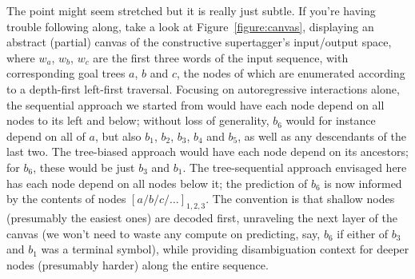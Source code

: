 The point might seem stretched but it is really just subtle.
If you're having trouble following along, take a look at Figure~\ref{figure:canvas}, displaying an abstract (partial) canvas of the constructive supertagger's input/output space, where $w_a$, $w_b$, $w_c$ are the first three words of the input sequence, with corresponding goal trees $a$, $b$ and $c$, the nodes of which are enumerated according to a depth-first left-first traversal.
Focusing on autoregressive interactions alone, the sequential approach we started from would have each node depend on all nodes to its left and below; without loss of generality, $b_6$ would for instance depend on all of $a$, but also $b_1$, $b_2$, $b_3$, $b_4$ and $b_5$, as well as any descendants of the last two.
The tree-biased approach would have each node depend on its ancestors; for $b_6$, these would be just $b_3$ and $b_1$.
The tree-sequential approach envisaged here has each node depend on all nodes below it; the prediction of $b_6$ is now informed by the contents of nodes $[a/b/c/\dots]_{1,2,3}$.
The convention is that shallow nodes (presumably the easiest ones) are decoded first, unraveling the next layer of the canvas (we won't need to waste any compute on predicting, say, $b_6$ if either of $b_3$ and $b_1$ was a terminal symbol), while providing disambiguation context for deeper nodes (presumably harder) along the entire sequence.

